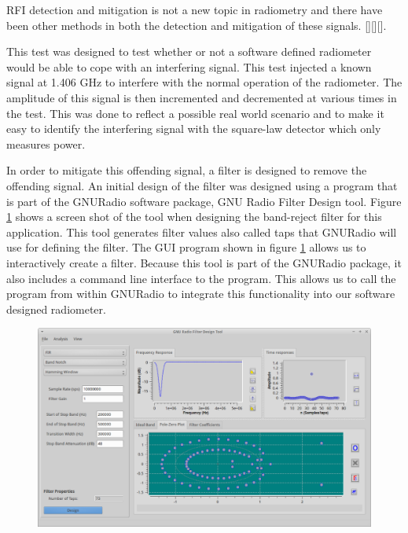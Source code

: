 RFI detection and mitigation is not a new topic in radiometry and there have been other methods in both the detection and mitigation of these signals.  [\cite{Forte}][\cite{McIntyre_RFI}][\cite{DeRoo}].

This test was designed to test whether or not a software defined radiometer would be able to cope with an interfering signal.  This test injected a known signal at 1.406 GHz to interfere with the normal operation of the radiometer.  The amplitude of this signal is then incremented and decremented at various times in the test.  This was done to reflect a possible real world scenario and to make it easy to identify the interfering signal with the square-law detector which only measures power.  

In order to mitigate this offending signal, a filter is designed to remove the offending signal.  An initial design of the filter was designed using a program that is part of the GNURadio software package, GNU Radio Filter Design tool.  Figure \ref{GRC_Filter_DSN} shows a screen shot of the tool when designing the band-reject filter for this application.  This tool generates filter values also called taps that GNURadio will use for defining the filter.  The GUI program shown in figure \ref{GRC_Filter_DSN} allows us to interactively create a filter.  Because this tool is part of the GNURadio package, it also includes a command line interface to the program.  This allows us to call the program from within GNURadio to integrate this functionality into our software designed radiometer.  

\begin{figure}[h!tb] \centering
\includegraphics[width=\textwidth]{Images/GNURadio_Filter_dsn.png}
\label{GRC_Filter_DSN}
\end{figure}  

